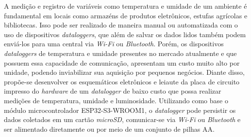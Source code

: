 

A medição e registro de variáveis como temperatura e umidade de um ambiente é fundamental em locais como armazéns de produtos eletrônicos, estufas agrícolas e bibliotecas. Isso pode ser realizado de maneira manual ou automatizada com o uso de dispositivos \textit{dataloggers}, que além de salvar os dados lidos também podem enviá-los para uma central via \textit{Wi-Fi} ou \textit{Bluetooth}. Porém, os dispositivos \textit{dataloggers} de temperatura e umidade presentes no mercado atualmente e que possuem essa capacidade de comunicação, apresentam um custo muito alto por unidade, podendo inviabilizar sua aquisição por pequenos negócios. Diante disso, propõe-se desenvolver os esquemáticos eletrônicos e leiaute da placa de circuito impresso do \textit{hardware} de um \textit{datalogger} de baixo custo que possa realizar medições de temperatura, umidade e luminosidade. Utilizando como base o módulo microcontrolador ESP32-S3-WROOM1, o \textit{datalogger} pode persistir os dados coletados em um cartão \textit{microSD}, comunicar-se via \textit{Wi-Fi} ou \textit{Bluetooth} e ser alimentado diretamente ou por meio de um conjunto de pilhas AA. 
































